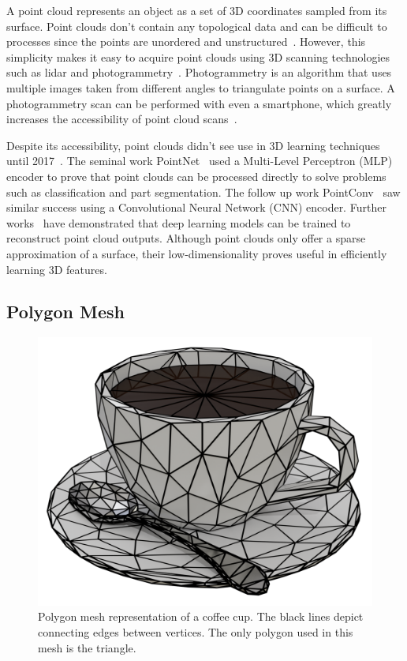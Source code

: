 A point cloud represents an object as a set of 3D coordinates sampled from its surface. Point clouds don't contain any topological data and can be difficult to processes since the points are unordered and unstructured~\cite{Xiao2020}. However, this simplicity makes it easy to acquire point clouds using 3D scanning technologies such as lidar and photogrammetry~\cite{Leberl2010}. Photogrammetry is an algorithm that uses multiple images taken from different angles to triangulate points on a surface. A photogrammetry scan can be performed with even a smartphone, which greatly increases the accessibility of point cloud scans~\cite{Micheletti2015}.

Despite its accessibility, point clouds didn't see use in 3D learning techniques until 2017~\cite{Xiao2020}. The seminal work PointNet~\cite{Qi2017} used a Multi-Level Perceptron (MLP) encoder to prove that point clouds can be processed directly to solve problems such as classification and part segmentation. The follow up work PointConv~\cite{Wu2019} saw similar success using a Convolutional Neural Network (CNN) encoder. Further works~\cite{Fan2017, Achlioptas2018} have demonstrated that deep learning models can be trained to reconstruct point cloud outputs. Although point clouds only offer a sparse approximation of a surface, their low-dimensionality proves useful in efficiently learning 3D features.


\subsection{Polygon Mesh}
\label{subsec:polygon_mesh}

\begin{figure}[h]
	\centering
	\includegraphics[scale=0.2]{Images/Mesh Cup}
	\caption{Polygon mesh representation of a coffee cup. The black lines depict connecting edges between vertices. The only polygon used in this mesh is the triangle.}
	\label{fig:mesh_cup}
\end{figure}

